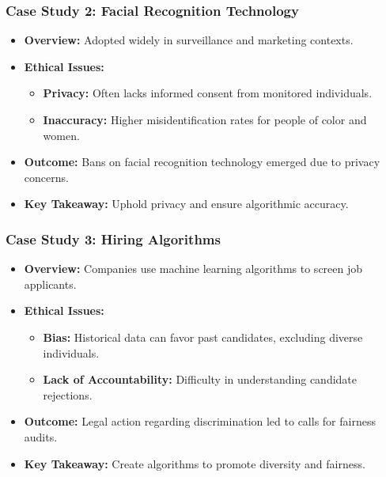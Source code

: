 \documentclass[aspectratio=169]{beamer}
\begin{document}
\begin{frame}[fragile]
    \frametitle{Case Study 2: Facial Recognition Technology}
    \begin{itemize}
        \item \textbf{Overview:} Adopted widely in surveillance and marketing contexts.
        
        \item \textbf{Ethical Issues:}
            \begin{itemize}
                \item \textbf{Privacy:} Often lacks informed consent from monitored individuals.
                \item \textbf{Inaccuracy:} Higher misidentification rates for people of color and women.
            \end{itemize}
        
        \item \textbf{Outcome:} Bans on facial recognition technology emerged due to privacy concerns.
        
        \item \textbf{Key Takeaway:} Uphold privacy and ensure algorithmic accuracy.
    \end{itemize}
\end{frame}

\begin{frame}[fragile]
    \frametitle{Case Study 3: Hiring Algorithms}
    \begin{itemize}
        \item \textbf{Overview:} Companies use machine learning algorithms to screen job applicants.
        
        \item \textbf{Ethical Issues:}
            \begin{itemize}
                \item \textbf{Bias:} Historical data can favor past candidates, excluding diverse individuals.
                \item \textbf{Lack of Accountability:} Difficulty in understanding candidate rejections.
            \end{itemize}
        
        \item \textbf{Outcome:} Legal action regarding discrimination led to calls for fairness audits.
        
        \item \textbf{Key Takeaway:} Create algorithms to promote diversity and fairness.
    \end{itemize}
\end{frame}
\end{document}

